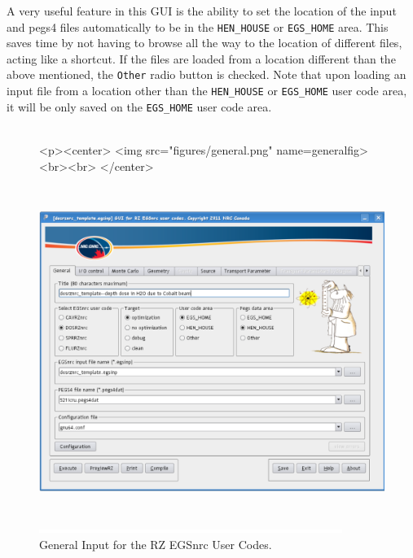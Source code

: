 \documentclass[12pt,twoside]{article}   %
\begin{document}
A very useful feature in this GUI is the ability to set the location of the input and 
pegs4 files automatically to be in the {\tt HEN\_HOUSE} or {\tt EGS\_HOME} area. This saves
time by not having to browse all the way to the location of different files, acting like 
a shortcut. If the files are loaded from a location different than the above
mentioned, the {\tt Other} radio button is checked. Note that upon loading an input file
from a location other than the {\tt HEN\_HOUSE} or {\tt EGS\_HOME} user code area, it will
be only saved on the {\tt EGS\_HOME} user code area. \\ \\
\begin{figure}[htb]
\begin{htmlonly}
\begin{rawhtml}
<p><center>
<img src="figures/general.png" name=generalfig><br><br>
</center>
\end{rawhtml}
\end{htmlonly}
\begin{latexonly}
\begin{center}
\includegraphics[height=10.78cm]{figures/general}
\end{center}
\end{latexonly}
\begin{center}
\includegraphics[height=1mm]{figures/fake2}
\end{center}
\caption{General Input for the RZ EGSnrc User Codes.}
\label{generalfig}
\end{figure}
\end{document}
